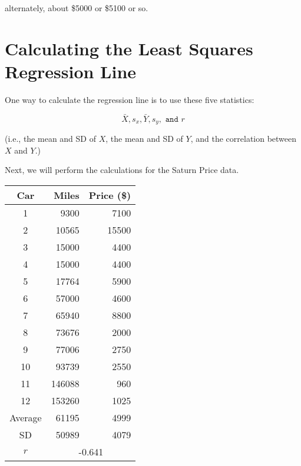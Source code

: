 \documentclass[11pt]{book}\usepackage[]{graphicx}\usepackage[]{color}
\begin{document}
alternately, about \$5000 or \$5100 or so.

\section{Calculating the Least Squares Regression Line}

One way to calculate the regression line is to use these five statistics:

$$ \bar{X}, s_x, \bar{Y},s_y, \texttt{ and } r  $$

(i.e., the mean and SD of $X$, the mean and SD of $Y$, and the correlation between $X$ and $Y$.)

\begin{center}
\end{center}

Next, we will perform the calculations for the Saturn Price data. 

\begin{table}[ht]
\centering 
\begin{tabular}{@{} c rr @{}} \hline 
Car & Miles & Price (\$) \\ \hline
1 & 9300 & 7100 \\
2 & 10565 & 15500 \\
3 & 15000 & 4400 \\
4 & 15000 & 4400 \\
5 & 17764 & 5900 \\
6 & 57000 & 4600 \\
7 & 65940 & 8800 \\
8 & 73676 & 2000 \\
9 & 77006 & 2750 \\
10 & 93739 & 2550 \\
11 & 146088 & 960 \\
12 & 153260 & 1025 \\ \hline
Average & 61195 & 4999 \\
SD  & 50989 & 4079 \\
$r$ & \multicolumn{2}{c}{-0.641} \\ \hline
\end{tabular}
\end{table}
\end{document}
